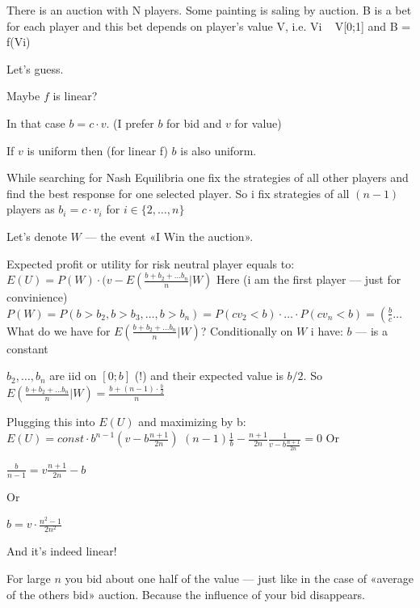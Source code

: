 \begin{problem}

There is an auction with N players. Some painting is saling by auction. B is a bet for each player and this bet depends on player's value V, i.e. Vi ~ V[0;1] and B = f(Vi)



\begin{sol}

Let's guess.\par

Maybe $f$ is linear? \par
In that case $b = c\cdot v$. (I prefer $b$ for bid and $v$ for value) \par
If $v$ is uniform then (for linear f) $b$ is also uniform. \par

While searching for Nash Equilibria one fix the strategies of all other players and find the best response for one selected player. So i fix strategies of all $(n - 1)$ players as $b_{i} = c\cdot v_{i}$ for $i\in\{2,\ldots ,n\}$\par

Let's denote $W$ — the event «I Win the auction».\par

Expected profit or utility for risk neutral player equals to:
$E(U) = P(W)\cdot (v - E(\frac {b + b_{2} + \ldots b_{n}}{n}|W)$
Here (i am the first player — just for convinience)
$P(W) = P(b > b_{2}, b > b_{3}, \ldots, b > b_{n}) = P(cv_{2} < b)\cdot\ldots \cdot P(cv_{n} < b) = \left(\frac {b}{c}\right. \ldots$
What do we have for $E\left(\frac {b + b_{2} + \ldots b_{n}}{n}|W\right)$?
Conditionally on $W$ i have:
$b$ — is a constant\par
$b_{2}, \ldots ,b_{n}$ are iid on $[0;b]$ (!) and their expected value is $b/2$.
So $E\left(\frac {b + b_{2} + \ldots b_{n}}{n}|W\right) = \frac {b + (n - 1)\cdot \frac {b}{2}}{n}$ \par

Plugging this into $E(U)$ and maximizing by b:
$E(U) = const\cdot b^{n - 1}(v - b\frac {n + 1}{2n})$
$(n - 1)\frac {1}{b} - \frac {n + 1}{2n}\frac {1}{v - b\frac {n + 1}{2n}} = 0$
Or\par
$\frac {b}{n - 1} = v\frac {n + 1}{2n} - b$\par
Or\par
$b = v\cdot \frac {n^2 - 1}{2n^{2}}$\par
And it's indeed linear!\par

For large $n$ you bid about one half of the value — just like in the case of «average of the others bid» auction. Because the influence of your bid disappears.
\end{sol}
\end{problem}




